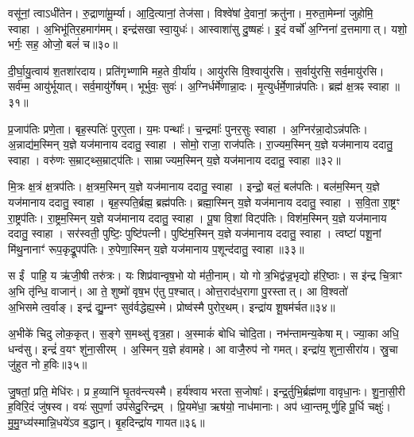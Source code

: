 वसू॑नां॒ त्वा\-ऽधी॑तेन।
रु॒द्राणा॑मू॒र्म्या।
आ॒दि॒त्यानां॒ तेज॑सा।
विश्वे॑षां दे॒वानां॒ क्रतु॑ना।
म॒रुता॒मेम्ना॑ जुहोमि॒ स्वाहा।
अ॒भिभू॑तिर॒हमाग॑मम्।
इन्द्र॑सखा स्वा॒युधः॑।
आस्वाशा॑सु दु॒ष्षहः॑।
इ॒दं वर्चो॑ अ॒ग्निना॑ द॒त्तमागात्।
यशो॒ भर्गः॒ सह॒ ओजो॒ बलं॑ च॥३०॥

दी॒र्घा॒यु॒त्वाय॑ श॒तशा॑रदाय।
प्रति॑गृभ्णामि मह॒ते वी॒र्या॑य।
आयु॑रसि वि॒श्वायु॑रसि।
स॒र्वायु॑रसि॒ सर्व॒मायु॑रसि।
सर्व॑म्म॒ आयु॑र्भूयात्।
सर्व॒मायु॑र्गेषम्।
भूर्भुवः॒ सुवः॑।
अ॒ग्निर्धर्मे॑णान्ना॒दः।
मृ॒त्युर्धर्मे॒णान्न॑पतिः।
ब्रह्म॑ क्ष॒त्रꣴ स्वाहा॥३१॥

प्र॒जाप॑तिः प्रणे॒ता।
बृह॒स्पतिः॑ पुरए॒ता।
य॒मः पन्थाः᳚।
च॒न्द्रमाः᳚ पुनर॒सुः स्वाहा।
अ॒ग्निर॑न्ना॒दो\-ऽन्न॑पतिः।
अ॒न्नाद्य॑म॒स्मिन् य॒ज्ञे यज॑मानाय ददातु॒ स्वाहा।
सोमो॒ राजा॒ राज॑पतिः।
रा॒ज्यम॒स्मिन् य॒ज्ञे यज॑मानाय ददातु॒ स्वाहा।
वरु॑णः स॒म्राट्थ्स॒म्राट्प॑तिः।
साम्राज्यम॒स्मिन् य॒ज्ञे यज॑मानाय ददातु॒ स्वाहा॥३२॥

मि॒त्रः क्ष॒त्रं क्ष॒त्रप॑तिः।
क्ष॒त्रम॒स्मिन् य॒ज्ञे यज॑मानाय ददातु॒ स्वाहा।
इन्द्रो॒ बलं॒ बल॑पतिः।
बल॑म॒स्मिन् य॒ज्ञे यज॑मानाय ददातु॒ स्वाहा।
बृह॒स्पति॒र्ब्रह्म॒ ब्रह्म॑पतिः।
ब्रह्मा॒स्मिन् य॒ज्ञे यज॑मानाय ददातु॒ स्वाहा।
स॒वि॒ता रा॒ष्ट्रꣳ रा॒ष्ट्रप॑तिः।
रा॒ष्ट्रम॒स्मिन् य॒ज्ञे यज॑मानाय ददातु॒ स्वाहा।
पू॒षा वि॒शां विट्प॑तिः।
विश॑म॒स्मिन् य॒ज्ञे यज॑मानाय ददातु॒ स्वाहा।
सर॑स्वती॒ पुष्टिः॒ पुष्टि॑पत्नी।
पुष्टि॑म॒स्मिन् य॒ज्ञे यज॑मानाय ददातु॒ स्वाहा।
त्वष्टा॑ पशू॒नां मि॑थु॒नानाꣳ॑ रूप॒कृद्रू॒पप॑तिः।
रु॒पेणा॒स्मिन् य॒ज्ञे यज॑मानाय प॒शून्द॑दातु॒ स्वाहा॥३३॥\anuvakamend[च॒ स्वाहा॒ साम्राज्यम॒स्मिन् य॒ज्ञे यज॑मानाय ददातु॒ स्वाहा॒ विश॑म॒स्मिन् य॒ज्ञे यज॑मानाय ददातु॒ स्वाहा॑ च॒त्वारि॑ च (अ॒ग्निः सोमो॒ वरु॑णो मि॒त्र इन्द्रो॒ बृह॒स्पतिः॑ सवि॒ता पू॒षा सर॑स्वती॒ त्वष्टा॒ दश॑॥)]

स ईं पाहि॒ य ऋ॑जी॒षी तरु॑त्रः।
यः शिप्र॑वान्वृष॒भो यो म॑ती॒नाम्।
यो गोत्र॒भिद्व॑ज्र॒भृद्यो ह॑रि॒ष्ठाः।
स इ॑न्द्र चि॒त्राꣳ अ॒भि तृ॑न्धि॒ वाजान्॑।
आ ते॒ शुष्मो॑ वृष॒भ ए॑तु प॒श्चात्।
ओत्त॒राद॑ध॒रागा पु॒रस्तात्।
आ वि॒श्वतो॑ अ॒भिसमेत्व॒र्वाङ्।
इन्द्र॑ द्यु॒म्नꣳ सुव॑र्वद्धेह्य॒स्मे।
प्रोष्व॑स्मै पुरोर॒थम्।
इन्द्रा॑य शू॒षम॑र्चत॥३४॥

अ॒भीके॑ चिदु लोक॒कृत्।
स॒ङ्गे स॒मथ्सु॑ वृत्र॒हा।
अ॒स्माकं॑ बोधि चोदि॒ता।
नभ॑न्तामन्य॒केषाम्।
ज्या॒का अधि॒ धन्व॑सु।
इन्द्रं॑ व॒यꣳ शु॑ना॒सीरम्।
अ॒स्मिन् य॒ज्ञे ह॑वामहे।
आ वाजै॒रुप॑ नो गमत्।
इन्द्रा॑य॒ शुना॒सीरा॑य।
स्रु॒चा जु॑हुत नो ह॒विः॥३५॥

जु॒षतां॒ प्रति॒ मेधि॑रः।
प्र ह॒व्यानि॑ घृ॒तव॑न्त्यस्मै।
हर्य॑श्वाय भरता स॒जोषाः᳚।
इन्द्र॒र्तुभि॒र्ब्रह्म॑णा वावृधा॒नः।
शु॒ना॒सी॒री ह॒विरि॒दं जु॑षस्व।
वयः॑ सुप॒र्णा उप॑सेदु॒रिन्द्रम्।
प्रि॒यमे॑धा॒ ऋष॑यो॒ नाध॑मानाः।
अप॑ ध्वा॒न्तमूर्णु॒हि पू॒र्धि चक्षुः॑।
मु॒मु॒ग्ध्य॑स्मान्नि॒धये॑ऽव ब॒द्धान्।
बृ॒हदिन्द्रा॑य गायत॥३६॥

